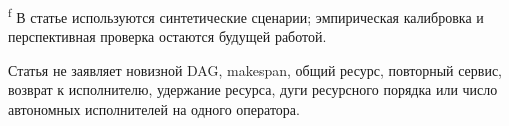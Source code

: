 \begin{landscape}
\begin{table}[!ht]
\begin{minipage}{0.97\linewidth}
\textsuperscript{f} В статье используются синтетические сценарии; эмпирическая калибровка и перспективная проверка остаются будущей работой.

\medskip
Статья не заявляет новизной DAG, makespan, общий ресурс, повторный сервис, возврат к исполнителю, удержание ресурса, дуги ресурсного порядка или число автономных исполнителей на одного оператора.
\end{minipage}
\end{table}
\end{landscape}
